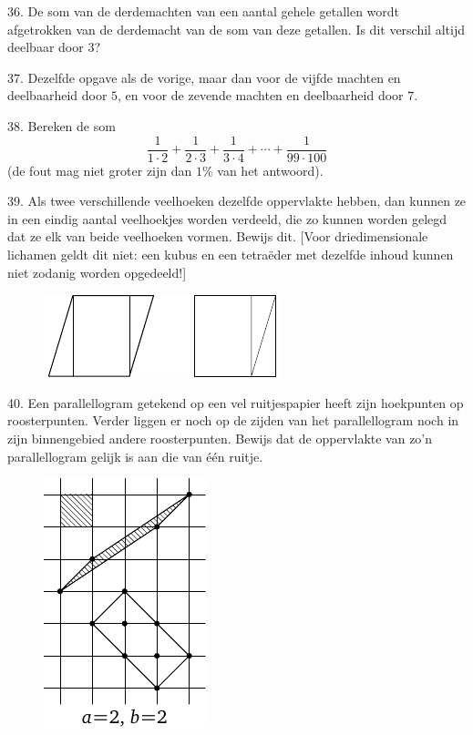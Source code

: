 \begin{problem}{36.}
	De som van de derdemachten van een aantal gehele getallen wordt afgetrokken van de derdemacht van de som van deze getallen. Is dit verschil altijd deelbaar door $3$?
\end{problem}

\begin{problem}{37.}
	Dezelfde opgave als de vorige, maar dan voor de vijfde machten en deelbaarheid door $5$, en voor de zevende machten en deelbaarheid door $7$.
\end{problem}

\begin{problem}{38.}
	Bereken de som
	\begin{equation*}
		\frac{1}{1\cdot 2} + \frac{1}{2\cdot 3} + \frac{1}{3\cdot 4} + \dotsb + \frac{1}{99\cdot 100}
	\end{equation*}
	(de fout mag niet groter zijn dan $1\%$ van het antwoord).
\end{problem}

\begin{problem}{39.}
	Als twee verschillende veelhoeken dezelfde oppervlakte hebben, dan kunnen ze in een eindig aantal veelhoekjes worden verdeeld, die zo kunnen worden gelegd dat ze elk van beide veelhoeken vormen. Bewijs dit. [Voor driedimensionale lichamen geldt dit niet: een kubus en een tetraëder met dezelfde inhoud kunnen niet zodanig worden opgedeeld!]
	\begin{figure}
		\includegraphics{resources/q39_horizontal}
	\end{figure}
\end{problem}

\clearpage

\begin{problem}{40.}
	Een parallellogram getekend op een vel ruitjespapier heeft zijn hoekpunten op roosterpunten. Verder liggen er noch op de zijden van het parallellogram noch in zijn binnengebied andere roosterpunten. Bewijs dat de oppervlakte van zo'n parallellogram gelijk is aan die van één ruitje.
	\begin{figure}
		\includegraphics{resources/taskbook-24}
	\end{figure}
\end{problem}

